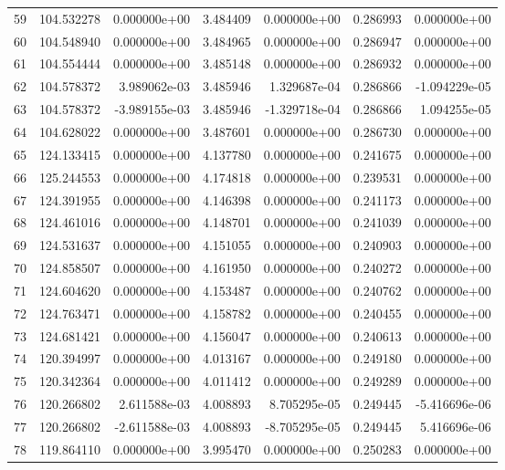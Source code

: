 \begin{tabular}{rrrrrrr}
59 & 104.532278 &  0.000000e+00 &  3.484409 &  0.000000e+00 &   0.286993 &  0.000000e+00 \\
60 & 104.548940 &  0.000000e+00 &  3.484965 &  0.000000e+00 &   0.286947 &  0.000000e+00 \\
61 & 104.554444 &  0.000000e+00 &  3.485148 &  0.000000e+00 &   0.286932 &  0.000000e+00 \\
62 & 104.578372 &  3.989062e-03 &  3.485946 &  1.329687e-04 &   0.286866 & -1.094229e-05 \\
63 & 104.578372 & -3.989155e-03 &  3.485946 & -1.329718e-04 &   0.286866 &  1.094255e-05 \\
64 & 104.628022 &  0.000000e+00 &  3.487601 &  0.000000e+00 &   0.286730 &  0.000000e+00 \\
65 & 124.133415 &  0.000000e+00 &  4.137780 &  0.000000e+00 &   0.241675 &  0.000000e+00 \\
66 & 125.244553 &  0.000000e+00 &  4.174818 &  0.000000e+00 &   0.239531 &  0.000000e+00 \\
67 & 124.391955 &  0.000000e+00 &  4.146398 &  0.000000e+00 &   0.241173 &  0.000000e+00 \\
68 & 124.461016 &  0.000000e+00 &  4.148701 &  0.000000e+00 &   0.241039 &  0.000000e+00 \\
69 & 124.531637 &  0.000000e+00 &  4.151055 &  0.000000e+00 &   0.240903 &  0.000000e+00 \\
70 & 124.858507 &  0.000000e+00 &  4.161950 &  0.000000e+00 &   0.240272 &  0.000000e+00 \\
71 & 124.604620 &  0.000000e+00 &  4.153487 &  0.000000e+00 &   0.240762 &  0.000000e+00 \\
72 & 124.763471 &  0.000000e+00 &  4.158782 &  0.000000e+00 &   0.240455 &  0.000000e+00 \\
73 & 124.681421 &  0.000000e+00 &  4.156047 &  0.000000e+00 &   0.240613 &  0.000000e+00 \\
74 & 120.394997 &  0.000000e+00 &  4.013167 &  0.000000e+00 &   0.249180 &  0.000000e+00 \\
75 & 120.342364 &  0.000000e+00 &  4.011412 &  0.000000e+00 &   0.249289 &  0.000000e+00 \\
76 & 120.266802 &  2.611588e-03 &  4.008893 &  8.705295e-05 &   0.249445 & -5.416696e-06 \\
77 & 120.266802 & -2.611588e-03 &  4.008893 & -8.705295e-05 &   0.249445 &  5.416696e-06 \\
78 & 119.864110 &  0.000000e+00 &  3.995470 &  0.000000e+00 &   0.250283 &  0.000000e+00 \\

\end{tabular}
